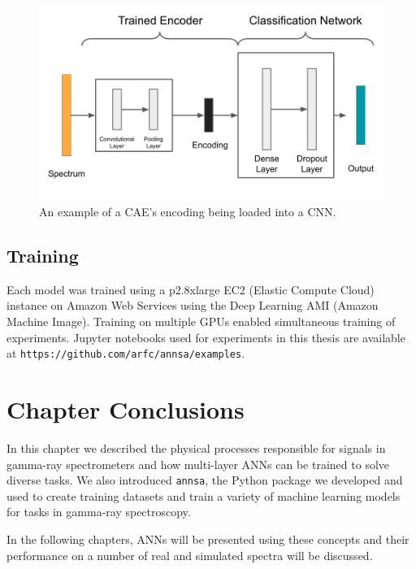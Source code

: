 \begin{figure}[H]
\centering
\includegraphics[trim=0 0 0 0,clip,width=0.9\linewidth]{images/annsa_caednn.png}
\caption{An example of a CAE's encoding being loaded into a CNN.}
\label{fig:annsa_caednn}
\end{figure}


\subsection{Training}

Each model was trained using a p2.8xlarge EC2 (Elastic Compute Cloud) instance on Amazon Web Services using the Deep Learning AMI (Amazon Machine Image). Training on multiple GPUs enabled simultaneous training of experiments. Jupyter notebooks used for experiments in this thesis are available at \verb|https://github.com/arfc/annsa/examples|.


\section{Chapter Conclusions}

In this chapter we described the physical processes responsible for signals in gamma-ray spectrometers and how multi-layer ANNs can be trained to solve diverse tasks. We also introduced \verb|annsa|, the Python package we developed and used to create training datasets and train a variety of machine learning models for tasks in gamma-ray spectroscopy. 

In the following chapters, ANNs will be presented using these concepts and their performance on a number of real and simulated spectra will be discussed. 
